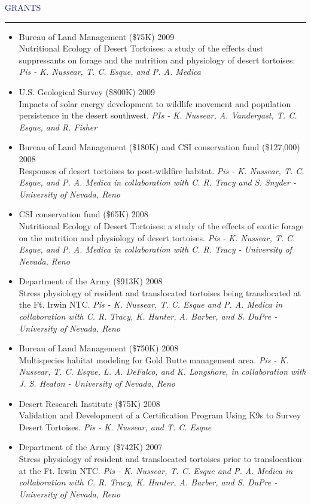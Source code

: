 \documentclass{resume} %
\renewenvironment{rSection}[1]{
\sectionskip
\textcolor{MidnightBlue}{\MakeUppercase{#1}}
\sectionlineskip
\hrule
\begin{list}{}{
\setlength{\leftmargin}{1.5em}
}
\item[]
}{
\end{list}
}
\begin{document}
\begin{rSection}{Grants}{}
\begin{itemize}
\item Bureau of Land Management (\$75K) \hfill 2009 \\ 
Nutritional Ecology of Desert Tortoises: a study of the effects dust suppressants on forage and the nutrition and physiology of desert tortoises: \textit{Pis - K. Nussear, T. C. Esque, and P. A. Medica}
\item U.S. Geological Survey (\$800K) \hfill 2009 \\ 
Impacts of solar energy development to wildlife movement and population persistence in the desert southwest. \textit{PIs - K. Nussear, A. Vandergast, T. C. Esque, and R. Fisher}
\item Bureau of Land Management (\$180K) and CSI conservation fund (\$127,000) \hfill 2008 \\ 
Responses of desert tortoises to post-wildfire habitat. \textit{Pis - K. Nussear, T. C. Esque, and P. A. Medica in collaboration with C. R. Tracy and S. Snyder - University of Nevada, Reno}
\item CSI conservation fund (\$65K) \hfill 2008 \\ 
Nutritional Ecology of Desert Tortoises: a study of the effects of exotic forage on the nutrition and physiology of desert tortoises. \textit{Pis - K. Nussear, T. C. Esque, and P. A. Medica in collaboration with C. R. Tracy - University of Nevada, Reno}
\item Department of the Army (\$913K) \hfill 2008 \\ 
Stress physiology of resident and translocated tortoises being translocated at the Ft. Irwin NTC. \textit{Pis - K. Nussear, T. C. Esque and P. A. Medica in collaboration with C. R. Tracy, K. Hunter, A. Barber, and S. DuPre - University of Nevada, Reno}
\item Bureau of Land Management (\$750K) \hfill 2008 \\ 
Multispecies habitat modeling for Gold Butte management area. \textit{Pis - K. Nussear, T. C. Esque, L. A. DeFalco, and K. Longshore, in collaboration with J. S. Heaton - University of Nevada, Reno}
\item Desert Research Institute (\$75K) \hfill 2008 \\ 
Validation and Development of a Certification Program Using K9s to Survey Desert Tortoises. \textit{Pis - K. Nussear, and T. C. Esque}
\item Department of the Army (\$742K) \hfill 2007 \\ 
Stress physiology of resident and translocated tortoises prior to translocation at the Ft. Irwin NTC. \textit{Pis - K. Nussear, T. C. Esque and P. A. Medica in collaboration with C. R. Tracy, K. Hunter, A. Barber, and S. DuPre - University of Nevada, Reno}

\end{itemize}
\end{rSection}
\end{document}
